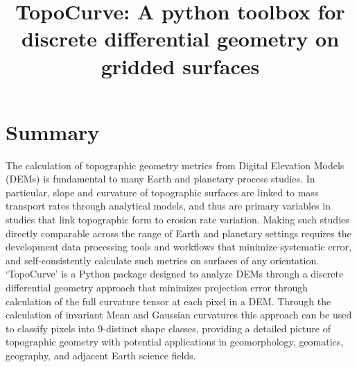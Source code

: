 \documentclass[esurf, manuscript]{copernicus}
\begin{document}
\title{TopoCurve: A python toolbox for discrete differential geometry on gridded surfaces}











\received{}
\pubdiscuss{} %
\revised{}
\accepted{}
\published{}



\maketitle

\begin{abstract}

\end{abstract}

\section{Summary}  
The calculation of topographic geometry metrics from Digital Elevation Models (DEMs) is fundamental to many Earth and planetary process studies. In particular, slope and curvature of topographic surfaces are linked to mass transport rates through analytical models, and thus are primary variables in studies that link topographic form to erosion rate variation. Making such studies directly comparable across the range of Earth and planetary settings requires the development data processing tools and workflows that minimize systematic error, and self-consistently calculate such metrics on surfaces of any orientation. `TopoCurve' is a Python package designed to analyze DEMs through a discrete differential geometry approach that minimizes projection error through calculation of the full curvature tensor at each pixel in a DEM. Through the calculation of invariant Mean and Gaussian curvatures this approach can be used to classify pixels into 9-distinct shape classes, providing a detailed picture of topographic geometry with potential applications in geomorphology, geomatics, geography, and adjacent Earth science fields.
\end{document}
